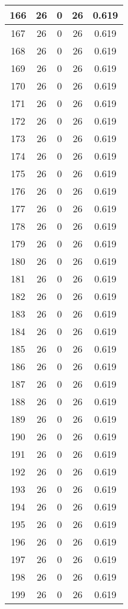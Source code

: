 \documentclass[letterpaper, 12pt]{article}
\begin{document}
\begin{longtable}{|c|c|c|c|c|}
\hline
166 & 26 & 0 & 26 & 0.619 \\
\hline
167 & 26 & 0 & 26 & 0.619 \\
\hline
168 & 26 & 0 & 26 & 0.619 \\
\hline
169 & 26 & 0 & 26 & 0.619 \\
\hline
170 & 26 & 0 & 26 & 0.619 \\
\hline
171 & 26 & 0 & 26 & 0.619 \\
\hline
172 & 26 & 0 & 26 & 0.619 \\
\hline
173 & 26 & 0 & 26 & 0.619 \\
\hline
174 & 26 & 0 & 26 & 0.619 \\
\hline
175 & 26 & 0 & 26 & 0.619 \\
\hline
176 & 26 & 0 & 26 & 0.619 \\
\hline
177 & 26 & 0 & 26 & 0.619 \\
\hline
178 & 26 & 0 & 26 & 0.619 \\
\hline
179 & 26 & 0 & 26 & 0.619 \\
\hline
180 & 26 & 0 & 26 & 0.619 \\
\hline
181 & 26 & 0 & 26 & 0.619 \\
\hline
182 & 26 & 0 & 26 & 0.619 \\
\hline
183 & 26 & 0 & 26 & 0.619 \\
\hline
184 & 26 & 0 & 26 & 0.619 \\
\hline
185 & 26 & 0 & 26 & 0.619 \\
\hline
186 & 26 & 0 & 26 & 0.619 \\
\hline
187 & 26 & 0 & 26 & 0.619 \\
\hline
188 & 26 & 0 & 26 & 0.619 \\
\hline
189 & 26 & 0 & 26 & 0.619 \\
\hline
190 & 26 & 0 & 26 & 0.619 \\
\hline
191 & 26 & 0 & 26 & 0.619 \\
\hline
192 & 26 & 0 & 26 & 0.619 \\
\hline
193 & 26 & 0 & 26 & 0.619 \\
\hline
194 & 26 & 0 & 26 & 0.619 \\
\hline
195 & 26 & 0 & 26 & 0.619 \\
\hline
196 & 26 & 0 & 26 & 0.619 \\
\hline
197 & 26 & 0 & 26 & 0.619 \\
\hline
198 & 26 & 0 & 26 & 0.619 \\
\hline
199 & 26 & 0 & 26 & 0.619 \\
\hline
\end{longtable}
\end{document}
